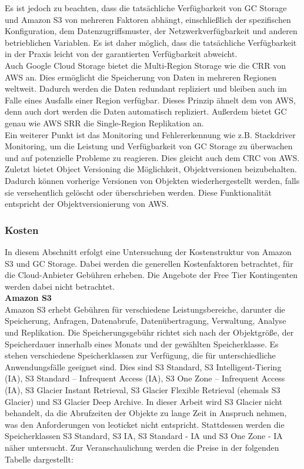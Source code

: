 Es ist jedoch zu beachten, dass die tatsächliche Verfügbarkeit von GC Storage und Amazon S3 von mehreren Faktoren abhängt, einschließlich der spezifischen Konfiguration, dem Datenzugriffsmuster, der Netzwerkverfügbarkeit und anderen betrieblichen Variablen. Es ist daher möglich, dass die tatsächliche Verfügbarkeit in der Praxis leicht von der garantierten Verfügbarkeit abweicht.\\

Auch Google Cloud Storage bietet die Multi-Region Storage wie die CRR von AWS an. Dies ermöglicht die Speicherung von Daten in mehreren Regionen weltweit. Dadurch werden die Daten redundant repliziert und bleiben auch im Falle eines Ausfalls einer Region verfügbar. Dieses Prinzip ähnelt dem von AWS, denn auch dort werden die Daten automatisch repliziert. Außerdem bietet GC genau wie AWS SRR die Single-Region Replikation an.\\

Ein weiterer Punkt ist das Monitoring und Fehlererkennung wie z.B. Stackdriver Monitoring, um die Leistung und Verfügbarkeit von GC Storage zu überwachen und auf potenzielle Probleme zu reagieren. Dies gleicht auch dem CRC von AWS.\\

Zuletzt bietet Object Versioning die Möglichkeit, Objektversionen beizubehalten. Dadurch können vorherige Versionen von Objekten wiederhergestellt werden, falls sie versehentlich gelöscht oder überschrieben werden. Diese Funktionalität entspricht der Objektversionierung von AWS.\\


\subsubsection{Kosten}

In diesem Abschnitt erfolgt eine Untersuchung der Kostenstruktur von Amazon S3 und GC Storage. Dabei werden die generellen Kostenfaktoren betrachtet, für die Cloud-Anbieter Gebühren erheben. Die Angebote der Free Tier Kontingenten werden dabei nicht betrachtet.\\

\textbf{Amazon S3}\\

Amazon S3 erhebt Gebühren für verschiedene Leistungsbereiche, darunter die Speicherung, Anfragen, Datenabrufe, Datenübertragung, Verwaltung, Analyse und Replikation. Die Speicherungsgebühr richtet sich nach der Objektgröße, der Speicherdauer innerhalb eines Monats und der gewählten Speicherklasse. Es stehen verschiedene Speicherklassen zur Verfügung, die für unterschiedliche Anwendungsfälle geeignet sind. Dies sind S3 Standard, S3 Intelligent-Tiering (IA), S3 Standard – Infrequent Access (IA), S3 One Zone – Infrequent Access (IA), S3 Glacier Instant Retrieval, S3 Glacier Flexible Retrieval (ehemals S3 Glacier) und S3 Glacier Deep Archive. In dieser Arbeit wird S3 Glacier nicht behandelt, da die Abrufzeiten der Objekte zu lange Zeit in Anspruch nehmen, was den Anforderungen von leoticket nicht entspricht. Stattdessen werden die Speicherklassen S3 Standard, S3 IA, S3 Standard - IA und S3 One Zone - IA näher untersucht. Zur Veranschaulichung werden die Preise in der folgenden Tabelle dargestellt:


